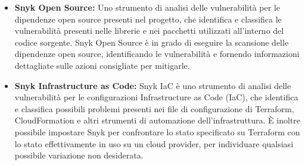 \begin{itemize}
\begin{figure}[H]
            \label{fig:snyk_container}
         \end{figure}
   \item \textbf{Snyk Open Source:} Uno strumento di analisi delle vulnerabilità per le dipendenze open source presenti nel progetto, che identifica e classifica le vulnerabilità presenti nelle librerie e nei pacchetti utilizzati all'interno del codice sorgente. Snyk Open Source è in grado di eseguire la scansione delle dipendenze open source, identificando le vulnerabilità e fornendo informazioni dettagliate sulle azioni consigliate per mitigarle.
   \item \textbf{Snyk Infrastructure as Code:} Snyk IaC è uno strumento di analisi delle vulnerabilità per le configurazioni Infrastructure as Code (IaC), che identifica e classifica possibili problemi presenti nei file di configurazione di Terraform, CloudFormation e altri strumenti di automazione dell'infrastruttura. È inoltre possibile impostare Snyk per confrontare lo stato specificato su Terraform con lo stato effettivamente in uso su un cloud provider, per individuare qualsiasi possibile variazione non desiderata.

\end{itemize}